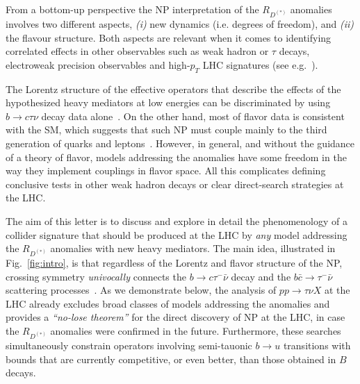 \documentclass[%
 reprint,
 superscriptaddress,preprintnumbers,
 amsmath,amssymb,
 aps,
]{revtex4-1}
\begin{document}
From a bottom-up perspective the NP interpretation of the $R_{D^{(*)}}$ anomalies involves two different aspects, \textit{(i)} new dynamics (i.e. degrees of freedom), and \textit{(ii)} the flavour structure. Both aspects are relevant when it comes to identifying correlated effects in other observables such as weak hadron or $\tau$ decays, electroweak precision observables and high-$p_T$ LHC signatures (see e.g.~\cite{Buttazzo:2017ixm}). 

The Lorentz structure of the effective operators that describe the effects of the hypothesized heavy mediators at low energies can be discriminated by using $b\to c \tau\nu$ decay data alone~\cite{Alonso:2016oyd,Datta:2017aue,Akeroyd:2017mhr,Tran:2018kuv,Nierste:2008qe,Fajfer:2012vx,Sakaki:2014sea,Ligeti:2016npd,Alonso:2016gym,Alonso:2017ktd,Asadi:2018sym}. On the other hand, most of flavor data is consistent with the SM, which suggests that such NP must couple mainly to the third generation of quarks and leptons~\cite{Bhattacharya:2014wla,Glashow:2014iga,Alonso:2015sja,Greljo:2015mma,Feruglio:2016gvd,Feruglio:2017rjo,Buttazzo:2017ixm,Kumar:2018kmr,Feruglio:2018fxo}. However, in general, and without the guidance of a theory of flavor, models addressing the anomalies have some freedom in the way they implement couplings in flavor space. All this complicates defining conclusive tests in other weak hadron decays or clear direct-search strategies at the LHC.

The aim of this letter is to discuss and explore in detail the phenomenology of a collider signature that should be produced at the LHC by \textit{any} model addressing the $R_{D^{(*)}}$ anomalies with new heavy mediators. The main idea, illustrated in Fig.~\ref{fig:intro}, is that regardless of the Lorentz and flavor structure of the NP, crossing symmetry \textit{univocally} connects the $b\to c\tau^-\bar\nu$ decay and the $b \bar c \to \tau^-\bar\nu$ scattering processes~\cite{Alonso:2016oyd,Bhattacharya:2011qm,Gonzalez-Alonso:2016etj,Altmannshofer:2017poe,Abdullah:2018ets}. As we demonstrate below, the analysis of $p p \to \tau\nu X$ at the LHC already excludes broad classes of models addressing the anomalies and provides a \textit{``no-lose theorem''} for the direct discovery of NP at the LHC, in case the $R_{D^{(*)}}$ anomalies were confirmed in the future. Furthermore, these searches simultaneously constrain operators involving semi-tauonic $b\to u$ transitions with bounds that are currently competitive, or even better, than those obtained in $B$ decays. 
\end{document}
